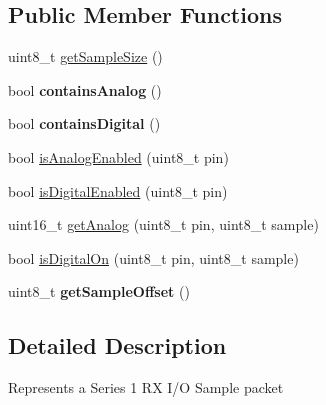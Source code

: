 \subsection*{\-Public \-Member \-Functions}
\begin{DoxyCompactItemize}
\item 
uint8\-\_\-t \hyperlink{classRxIoSampleBaseResponse_a44ce66a6751e7e39c8908fe179a21d24}{get\-Sample\-Size} ()
\item 
\hypertarget{classRxIoSampleBaseResponse_a9c6f6e1b7b8659ea086084ca35f9f83b}{bool {\bfseries contains\-Analog} ()}\label{classRxIoSampleBaseResponse_a9c6f6e1b7b8659ea086084ca35f9f83b}

\item 
\hypertarget{classRxIoSampleBaseResponse_ae70a93197c9e2fa6cfd5d64e189f0690}{bool {\bfseries contains\-Digital} ()}\label{classRxIoSampleBaseResponse_ae70a93197c9e2fa6cfd5d64e189f0690}

\item 
bool \hyperlink{classRxIoSampleBaseResponse_ad8fc07932c2e011b83814082b1d82400}{is\-Analog\-Enabled} (uint8\-\_\-t pin)
\item 
bool \hyperlink{classRxIoSampleBaseResponse_aa897267985b5b8c02abd68b50f954de7}{is\-Digital\-Enabled} (uint8\-\_\-t pin)
\item 
uint16\-\_\-t \hyperlink{classRxIoSampleBaseResponse_a81e98b2eab33f62e6af6b3b4014e841a}{get\-Analog} (uint8\-\_\-t pin, uint8\-\_\-t sample)
\item 
bool \hyperlink{classRxIoSampleBaseResponse_ad4ffc0eb84c685fe45618d6b73a20ce2}{is\-Digital\-On} (uint8\-\_\-t pin, uint8\-\_\-t sample)
\item 
\hypertarget{classRxIoSampleBaseResponse_a78098028dec69c655a190fb8d3cee333}{uint8\-\_\-t {\bfseries get\-Sample\-Offset} ()}\label{classRxIoSampleBaseResponse_a78098028dec69c655a190fb8d3cee333}

\end{DoxyCompactItemize}


\subsection{\-Detailed \-Description}
\-Represents a \-Series 1 \-R\-X \-I/\-O \-Sample packet 

